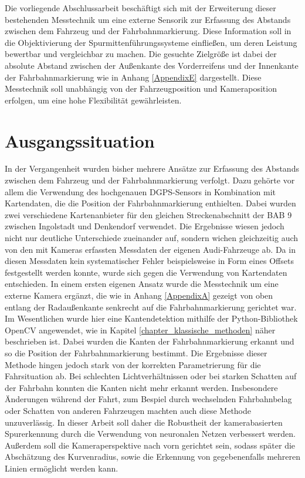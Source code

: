 Die vorliegende Abschlussarbeit beschäftigt sich mit der Erweiterung dieser bestehenden Messtechnik um eine externe Sensorik zur Erfassung des Abstands zwischen dem Fahrzeug und der Fahrbahnmarkierung. Diese Information soll in die Objektivierung der Spurmittenführungssysteme einflie{\ss}en, um deren Leistung bewertbar und vergleichbar zu machen. Die gesuchte Zielgrö{\ss}e ist dabei der absolute Abstand zwischen der Au{\ss}enkante des Vorderreifens und der Innenkante der Fahrbahnmarkierung wie in Anhang \ref{AppendixE} dargestellt. Diese Messtechnik soll unabhängig von der Fahrzeugposition und Kameraposition erfolgen, um eine hohe Flexibilität gewährleisten. 

\section{Ausgangssituation}
In der Vergangenheit wurden bisher mehrere Ansätze zur Erfassung des Abstands zwischen dem Fahrzeug und der Fahrbahnmarkierung verfolgt. Dazu gehörte vor allem die Verwendung des hochgenauen DGPS-Sensors in Kombination mit Kartendaten, die die Position der Fahrbahnmarkierung enthielten. Dabei wurden zwei verschiedene Kartenanbieter für den gleichen Streckenabschnitt der BAB 9 zwischen Ingolstadt und Denkendorf verwendet. Die Ergebnisse wiesen jedoch nicht nur deutliche Unterschiede zueinander auf, sondern wichen gleichzeitig auch von den mit Kameras erfassten Messdaten der eigenen Audi-Fahrzeuge ab. Da in diesen Messdaten kein systematischer Fehler beispielsweise in Form eines Offsets festgestellt werden konnte, wurde sich gegen die Verwendung von Kartendaten entschieden. 
In einem ersten eigenen Ansatz wurde die Messtechnik um eine externe Kamera ergänzt, die wie in Anhang \ref{AppendixA} gezeigt von oben entlang der Radau{\ss}enkante senkrecht auf die Fahrbahnmarkierung gerichtet war. Im Wesentlichen wurde hier eine Kantendetektion mithilfe der Python-Bibliothek OpenCV angewendet, wie in Kapitel \ref{chapter_klassische_methoden} näher beschrieben ist.
Dabei wurden die Kanten der Fahrbahnmarkierung erkannt und so die Position der Fahrbahnmarkierung bestimmt.
Die Ergebnisse dieser Methode hingen jedoch stark von der korrekten Parametrierung für die Fahrsituation ab. Bei schlechten Lichtverhältnissen oder bei starken Schatten auf der Fahrbahn konnten die Kanten nicht mehr erkannt werden. Insbesondere Änderungen während der Fahrt, zum Bespiel durch wechselnden Fahrbahnbelag oder Schatten von anderen Fahrzeugen machten auch diese Methode unzuverlässig.
In dieser Arbeit soll daher die Robustheit der kamerabasierten Spurerkennung durch die Verwendung von neuronalen Netzen verbessert werden. Au{\ss}erdem soll die Kameraperspektive nach vorn gerichtet sein, sodass später die Abschätzung des Kurvenradius, sowie die Erkennung von gegebenenfalls mehreren Linien ermöglicht werden kann.

